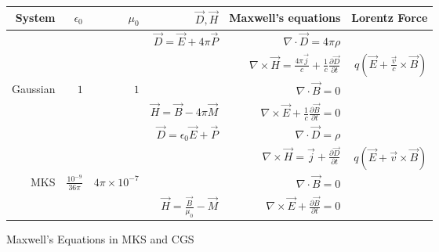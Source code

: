 \begin{figure} [h]
\begin{center}
\begin{tabular} {|r|r|r|r|r|r|}
\hline
{\bf System} & $\epsilon_0$ & $\mu_0$ & ${\vec D}, {\vec H}$ & {\bf Maxwell's equations} & {\bf Lorentz Force} \\
\hline
 & & & ${\vec D}= {\vec E} + 4 \pi {\vec P}$ & 
$\nabla \cdot {\vec D}= 4 \pi \rho$ & \\
 & & & & 
$\nabla \times {\vec H} = {\frac {4 \pi {\vec j}} {c}} + {\frac 1 c} {\frac {\partial {\vec D}} {\partial t}}$ & $q ({\vec E} + {\frac {\vec v} {c}} \times {\vec B})$ \\
Gaussian & $1$ & $1$ & & 
$\nabla \cdot {\vec B} = 0$ & \\
 & & & ${\vec H}= {\vec B} - 4 \pi {\vec M}$ & 
$\nabla \times {\vec E} + {\frac 1 c} {\frac {\partial {\vec B}} {\partial t}}= 0$ & \\
\hline
 & & & ${\vec D}= \epsilon_0 {\vec E} + {\vec P}$ & 
$\nabla \cdot {\vec D}= \rho$ & \\
 & & & &
$\nabla \times {\vec H} = {\vec j} + {\frac {\partial {\vec D}} {\partial t}}$ & 
$q( {\vec E} + {\vec v} \times {\vec B} )$ \\
MKS & ${\frac {10^{-9}} {36 \pi}}$ & $4 \pi \times 10^{-7}$ & & 
$\nabla \cdot {\vec B} = 0$ & \\
 & & & ${\vec H}= {\frac {\vec B} {\mu_0}} - {\vec M}$ & 
$\nabla \times {\vec E} + {\frac {\partial {\vec B}} {\partial t}}= 0$ & \\
\hline
\end{tabular}
\end{center}
\caption{Maxwell's Equations in MKS and CGS}
\end{figure}
